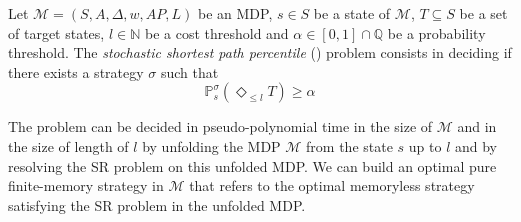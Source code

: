 \begin{definition}\label{sspp-def}
  Let $\mathcal{M} = (S, A, \Delta, w, AP, L)$ be an MDP, $s \in S$ be a state of
  $\mathcal{M}$, $T \subseteq S$ be a set of target states, $l \in \mathbb{N}$
  be a cost threshold and $\alpha \in [0, 1] \cap \mathbb{Q}$ be a probability
  threshold. The \textit{stochastic shortest path percentile} (\SSPP{}) problem
  consists in deciding if there exists a strategy $\sigma$ such that
  \[
    \mathbb{P}_s^\sigma (\Diamond_{\leq l} T) \geq \alpha
  \]
\end{definition}

\begin{theorem}\label{sspp-thm}
  The \SSPP{} problem can be decided in pseudo-polynomial time in the size of $\mathcal{M}$ and in the size of length of $l$ by unfolding the MDP $\mathcal{M}$ from the state $s$ up to $l$ and by resolving the SR problem on this unfolded MDP.
  We can build an optimal pure finite-memory strategy in $\mathcal{M}$ that refers to the optimal memoryless strategy satisfying the SR problem in the unfolded MDP.
\end{theorem}

